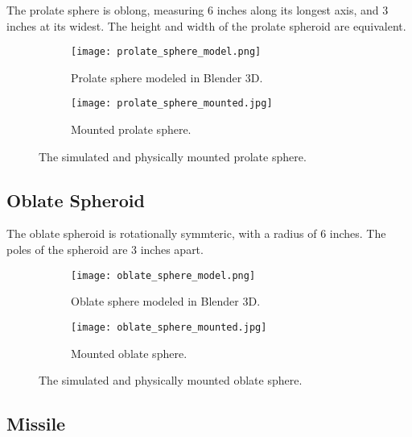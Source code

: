 The prolate sphere is oblong, measuring 6 inches along its longest axis, and 3 inches at its widest. The height and width of the prolate spheroid are equivalent.

\begin{figure}[htbp]
\centering
\begin{subfigure}{.5\textwidth}
  \centering
  \texttt{[image: prolate\_sphere\_model.png]}
  \caption{Prolate sphere modeled in Blender 3D.}
  \label{fig:ps_model}
\end{subfigure}%
\begin{subfigure}{.5\textwidth}
  \centering
  \texttt{[image: prolate\_sphere\_mounted.jpg]}
  \caption{Mounted prolate sphere.}
  \label{fig:ps_mount}
\end{subfigure}
\caption{The simulated and physically mounted prolate sphere.}
\label{fig:ps}
\end{figure}

\subsection{Oblate Spheroid}

The oblate spheroid is rotationally symmteric, with a radius of 6 inches. The poles of the spheroid are 3 inches apart.

\begin{figure}[htbp]
\centering
\begin{subfigure}{.5\textwidth}
  \centering
  \texttt{[image: oblate\_sphere\_model.png]}
  \caption{Oblate sphere modeled in Blender 3D.}
  \label{fig:os_model}
\end{subfigure}%
\begin{subfigure}{.5\textwidth}
  \centering
  \texttt{[image: oblate\_sphere\_mounted.jpg]}
  \caption{Mounted oblate sphere.}
  \label{fig:os_mount}
\end{subfigure}
\caption{The simulated and physically mounted oblate sphere.}
\label{fig:os}
\end{figure}

\subsection{Missile}
